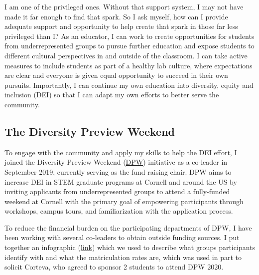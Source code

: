 \documentclass[11pt]{article}
\newcommand{\nicholas}[1]{{\color{nicholasCol} [\textbf{NS:} #1 (\today\ \currenttime)]}}
\newcommand{\amy}[1]{{\color{amyCol} [\textbf{Amy:} #1]}}
\begin{document}
I am one of the privileged ones. Without that support system, I may not have made it far enough to find that spark. So I ask myself, how can I provide adequate support and opportunity to help create that spark in those far less privileged than I? As an educator, I can work to create opportunities for students from underrepresented groups to pursue further education and expose students to different cultural perspectives in and outside of the classroom. I can take active measures to include students as part of a healthy lab culture, where expectations are clear and everyone is given equal opportunity to succeed in their own pursuits. Importantly, I can continue my own education into diversity, equity and inclusion (DEI) so that I can adapt my own efforts to better serve the community. %


\subsection*{The Diversity Preview Weekend}

To engage with the community and apply my skills to help the DEI effort, I joined the Diversity Preview Weekend (\href{https://cornelldpw.org}{DPW}) initiative as a co-leader in September 2019, currently serving as the fund raising chair. DPW aims to increase DEI in STEM graduate programs at Cornell and around the US by inviting applicants from underrepresented groups to attend a fully-funded weekend at Cornell with the primary goal of empowering participants through workshops, campus tours, and familiarization with the application process. 

To reduce the financial burden on the participating departments of DPW, I have been working with several co-leaders to obtain outside funding sources. I put together an infographic (\href{https://github.com/nsantantonio/DPWinfographic/blob/master/infoGraphic.pdf}{link}) which we used to describe what groups participants identify with and what the matriculation rates are, which was used in part to solicit Corteva, who agreed to sponsor 2 students to attend DPW 2020. %
\end{document}
